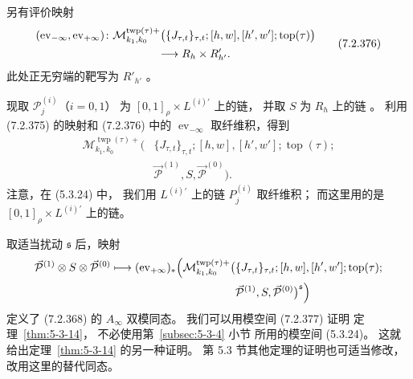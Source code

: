 另有评价映射
\begin{equation}
\begin{aligned}
&(\operatorname{ev}_{-\infty},
\operatorname{ev}_{+\infty})\colon
\mathcal M_{k_1,k_0}^{\operatorname{twp}(\tau)+}
\bigl(\{J_{\tau,t}\}_{\tau,t};
[h,w],[h',w'];\operatorname{top}(\tau)\bigr)
\\
&\hspace{38mm}\longrightarrow R_h\times R'_{h'}.
\end{aligned}
\tag{7.2.376}\label{eq:7-2-376}
\end{equation}
此处正无穷端的靶写为 $R'_{h'}$
。

现取 $\mathcal P_j^{(i)}$（$i=0,1$）
为 $[0,1]_\rho\times L^{(i)\prime}$ 上的链，
并取 $S$ 为 $R_h$ 上的链
。
利用 (7.2.375) 的映射和
(7.2.376) 中的
$\operatorname{ev}_{-\infty}$
取纤维积，得到
\begin{equation}
\begin{aligned}
\mathcal M_{k_1,k_0}^{\operatorname{twp}(\tau)+}
\bigl(&\{J_{\tau,t}\}_{\tau,t};
[h,w],[h',w'];\operatorname{top}(\tau);\\
&\vec{\mathcal P}^{(1)},S,
\vec{\mathcal P}^{(0)}\bigr).
\end{aligned}
\tag{7.2.377}\label{eq:7-2-377}
\end{equation}
注意，在 (5.3.24) 中，
我们用 $L^{(i)\prime}$ 上的链
$P_j^{(i)}$ 取纤维积；
而这里用的是
$[0,1]_\rho\times L^{(i)\prime}$
上的链。

取适当扰动 $\mathfrak s$ 后，映射
\[
\begin{aligned}
\vec{\mathcal P}^{(1)}\otimes S
\otimes\vec{\mathcal P}^{(0)}
\longmapsto
(\operatorname{ev}_{+\infty})_*
\Bigl(
\mathcal M_{k_1,k_0}^{\operatorname{twp}(\tau)+}
\bigl(&\{J_{\tau,t}\}_{\tau,t};
[h,w],[h',w'];\operatorname{top}(\tau);\\
&\vec{\mathcal P}^{(1)},S,
\vec{\mathcal P}^{(0)}\bigr)^{\mathfrak s}
\Bigr)
\end{aligned}
\]
定义了 (7.2.368) 的 $A_\infty$ 双模同态。
我们可以用模空间 (7.2.377) 证明
定理~\ref{thm:5-3-14}，
不必使用第~\ref{subsec:5-3-4} 小节
所用的模空间 (5.3.24)。
这就给出定理~\ref{thm:5-3-14} 的另一种证明。
第 5.3 节其他定理的证明也可适当修改，
改用这里的替代同态。
